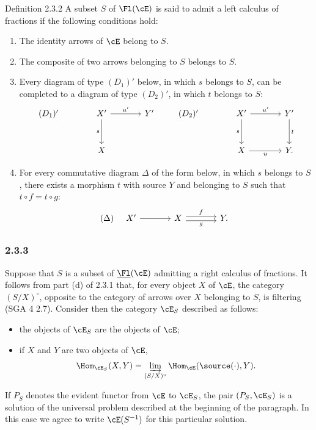 \begin{statement}{Definition 2.3.2}
A subset $S$ of $\Fl(\cE)$ is said to admit a left calculus of fractions if the following conditions hold:
\begin{enumerate}[label=(\alph*)]
\item[(a')] The identity arrows of $\cE$ belong to $S$.
\item[(b')] The composite of two arrows belonging to $S$ belongs to $S$.
\item[(c')] Every diagram of type $(D_1)'$ below, in which $s$ belongs to $S$, can be completed to a diagram of type $(D_2)'$, in which $t$ belongs to $S$:
\[
\begin{tikzcd}[column sep=large,row sep=large]
(D_1)'& X' \arrow[r,"u'"] \arrow[d,"s"'] & Y'\\
& X
\end{tikzcd}
\qquad
\begin{tikzcd}[column sep=large,row sep=large]
(D_2)'& X' \arrow[r,"u'"] \arrow[d,"s"'] & Y' \arrow[d,"t"]\\
& X \arrow[r,"u"'] & Y .
\end{tikzcd}
\]
\item[(d')] For every commutative diagram $\Delta$ of the form below, in which $s$ belongs to $S$, there exists a morphism $t$ with source $Y$ and belonging to $S$ such that $t\circ f=t\circ g$:
\[
(\Delta)\quad
\begin{tikzcd}[column sep=large]
X' \arrow[r] & X \arrow[r,shift left,"f"] \arrow[r,shift right,"g"'] & Y .
\end{tikzcd}
\]
\end{enumerate}
\end{statement}

\subsubsection*{2.3.3}
Suppose that $S$ is a subset of $\underline{\Fl}(\cE)$ admitting a right calculus of fractions. It follows from part (d) of 2.3.1 that, for every object $X$ of $\cE$, the category $(S/X)^\circ$, opposite to the category of arrows over $X$ belonging to $S$, is filtering (SGA 4  2.7). Consider then the category $\cE_S$ described as follows:
\begin{itemize}
\item the objects of $\cE_S$ are the objects of $\cE$;
\item if $X$ and $Y$ are two objects of $\cE$,
\[
\Hom_{\cE_S}(X,Y)=\varinjlim_{(S/X)^\circ}\Hom_{\cE}(\source(\cdot),Y).
\]
\end{itemize}
If $P_S$ denotes the evident functor from $\cE$ to $\cE_S$, the pair $(P_S,\cE_S)$ is a solution of the universal problem described at the beginning of the paragraph. In this case we agree to write $\cE(S^{-1})$ for this particular solution.


